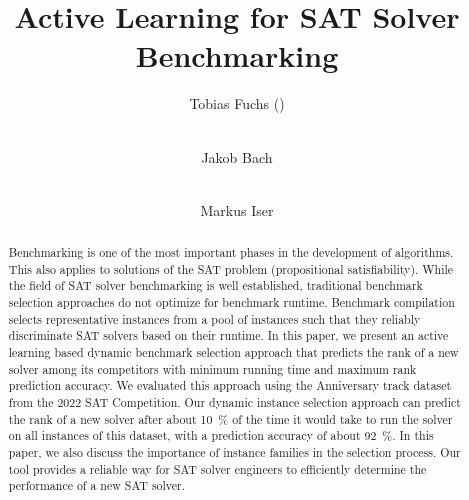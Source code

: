 \documentclass[runningheads]{llncs}
\begin{document}
\title{Active Learning for SAT Solver Benchmarking}

\author{
	Tobias Fuchs (\Letter) \and \\
	Jakob Bach \and \\
	Markus Iser
}



\maketitle

\begin{abstract}
  Benchmarking is one of the most important phases in the development of algorithms.
  This also applies to solutions of the SAT problem (propositional sat\-is\-fia\-bi\-li\-ty).
  While the field of SAT solver benchmarking is well established, traditional benchmark selection approaches do not optimize for benchmark runtime.
  Benchmark compilation selects representative instances from a pool of instances such that they reliably discriminate SAT solvers based on their runtime.
  In this paper, we present an active learning based dynamic benchmark selection approach that predicts the rank of a new solver among its competitors with minimum running time and maximum rank prediction accuracy.
  We evaluated this approach using the Anniversary track dataset from the 2022 SAT Competition. 
  Our dynamic instance selection approach can predict the rank of a new solver after about \SI{10}{\%} of the time it would take to run the solver on all instances of this dataset, with a prediction accuracy of about \SI{92}{\%}. 
  In this paper, we also discuss the importance of instance families in the selection process. 
  Our tool provides a reliable way for SAT solver engineers to efficiently determine the performance of a new SAT solver.

\end{abstract}
\end{document}
